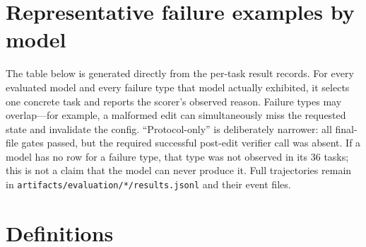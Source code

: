 \documentclass[11pt]{article}
\newcommand{\code}[1]{\texttt{#1}}
\begin{document}
\appendix
\section{Representative failure examples by model}

The table below is generated directly from the per-task result records.  For
every evaluated model and every failure type that model actually exhibited, it
selects one concrete task and reports the scorer's observed reason.  Failure
types may overlap---for example, a malformed edit can simultaneously miss the
requested state and invalidate the config.  ``Protocol-only'' is deliberately
narrower: all final-file gates passed, but the required successful post-edit
verifier call was absent.  If a model has no row for a failure type, that type
was not observed in its 36 tasks; this is not a claim that the model can never
produce it.  Full trajectories remain in
\code{artifacts/evaluation/*/results.jsonl} and their event files.



\section{Definitions}
\end{document}
